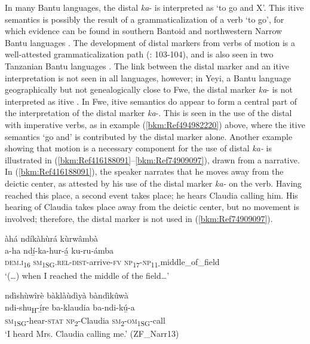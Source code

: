 In many Bantu languages, the distal \textit{ka}- is interpreted as ‘to go and X’. This itive semantics is possibly the result of a grammaticalization of a verb ‘to go’, for which evidence can be found in southern Bantoid and northwestern Narrow Bantu languages \citep{Botne1999}. The development of distal markers from verbs of motion is a well-attested grammaticalization path (\citealt{HeineEtAl1993}: 103-104), and is also seen in two Tanzanian Bantu languages \citep{Nicolle2003}. The link between the distal marker and an itive interpretation is not seen in all languages, however; in Yeyi, a Bantu language geographically but not genealogically close to Fwe, the distal marker \textit{ka}- is not interpreted as itive \citep{Seidel2007}. In Fwe, itive semantics do appear to form a central part of the interpretation of the distal marker \textit{ka}-. This is seen in the use of the distal with imperative verbs, as in example (\ref{bkm:Ref494982220}) above, where the itive semantics ‘go and’ is contributed by the distal marker alone. Another example showing that motion is a necessary component for the use of distal \textit{ka-} is illustrated in (\ref{bkm:Ref416188091}--\ref{bkm:Ref74909097}), drawn from a narrative. In (\ref{bkm:Ref416188091}), the speaker narrates that he moves away from the deictic center, as attested by his use of the distal marker \textit{ka-} on the verb. Having reached this place, a second event takes place; he hears Claudia calling him. His hearing of Claudia takes place away from the deictic center, but no movement is involved; therefore, the distal marker is not used in (\ref{bkm:Ref74909097}).

\ea
\label{bkm:Ref416188091}
àhá ndíkàhùrá kùrwâmbà\\
\gll a-ha    ndí̲-ka-hur-á̲      ku-ru-ámba\\
\textsc{dem}.\textsc{i}\textsubscript{16} \textsc{sm}\textsubscript{1SG}.\textsc{rel}-\textsc{dist}-arrive-\textsc{fv}  \textsc{np}\textsubscript{17}-\textsc{np}\textsubscript{11-}middle\_of\_field\\
\glt ‘(…) when I reached the middle of the field…’
\z

\ea
\label{bkm:Ref74909097}
ndìshùwîrè bàklàùdìyà bàndìkûwà\\
\gll ndi-shu\textsubscript{H}-í̲re    ba-klaudia  ba-ndi-kú̲-a\\
\textsc{sm}\textsubscript{1SG}-hear-\textsc{stat}  \textsc{np}\textsubscript{2}-Claudia  \textsc{sm}\textsubscript{2}-\textsc{om}\textsubscript{1SG}-call\\
\glt ‘I heard Mrs. Claudia calling me.’ (ZF\_Narr13)
\z

